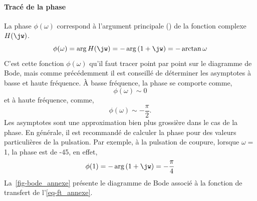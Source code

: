 \paragraph{Tracé de la phase}
La phase $\phi(\omega)$ correspond à l'argument principale () 
de la fonction complexe $H(\jw)$.
\[
\phi(\omega)=\arg{H(\jw)}=-\arg{(1+\jw)}=-\arctan{\omega}
\]
C'est cette fonction $\phi(\omega)$ qu'il faut tracer point par point 
sur le diagramme de Bode, mais comme précédemment
il est conseillé de déterminer les asymptotes à basse et haute fréquence.
\`A basse fréquence, la phase se comporte comme,
\[
\phi(\omega)\sim 0
\] 
et à haute fréquence, comme, 
\[
\phi(\omega)\sim -\dfrac{\pi}{2}.
\]
Les asymptotes sont une approximation bien plus 
grossière dans le cas de la phase. 
En générale, il est recommandé de 
calculer la phase pour des valeurs particulières de la 
pulsation. Par exemple, à la pulsation de coupure, 
lorsque $\omega=$1, la phase est de -45\degreeSI, en effet,
\[
\phi(1)=-\arg{(1+\jw)}=-\dfrac{\pi}{4}
\]
La~\cref{fig-bode_annexe} présente le diagramme de Bode associé à 
la fonction de transfert de l'\cref{eq-ft_annexe}.
